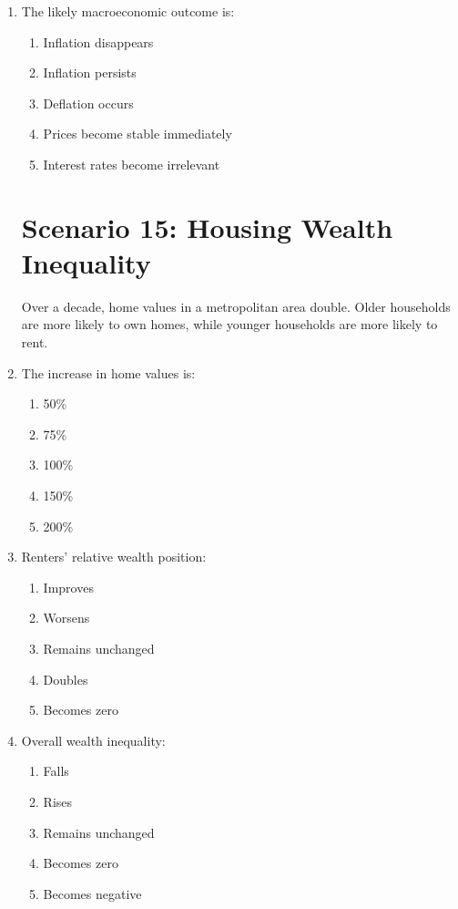 \documentclass[12pt]{article}
\begin{document}
\begin{enumerate}[label=\textbf{\arabic*.}]
\item The likely macroeconomic outcome is:
\begin{enumerate}[label=\Alph*.]
\item Inflation disappears
\item Inflation persists
\item Deflation occurs
\item Prices become stable immediately
\item Interest rates become irrelevant
\end{enumerate}

\section*{Scenario 15: Housing Wealth Inequality}

Over a decade, home values in a metropolitan area double. Older households are more likely to own homes, while younger households are more likely to rent.

\item The increase in home values is:
\begin{enumerate}[label=\Alph*.]
\item 50\%
\item 75\%
\item 100\%
\item 150\%
\item 200\%
\end{enumerate}

\item Renters' relative wealth position:
\begin{enumerate}[label=\Alph*.]
\item Improves
\item Worsens
\item Remains unchanged
\item Doubles
\item Becomes zero
\end{enumerate}

\item Overall wealth inequality:
\begin{enumerate}[label=\Alph*.]
\item Falls
\item Rises
\item Remains unchanged
\item Becomes zero
\item Becomes negative
\end{enumerate}


\end{enumerate}
\end{document}

